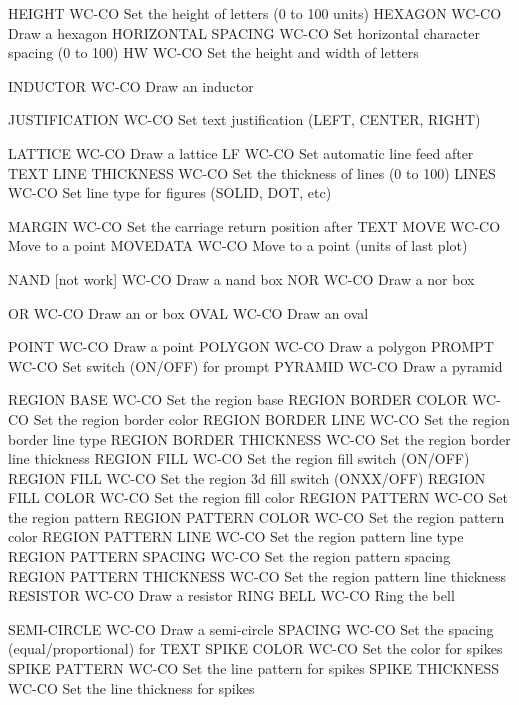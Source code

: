 HEIGHT                      WC-CO Set the height of letters (0 to 100 units)
HEXAGON                     WC-CO Draw a hexagon
HORIZONTAL SPACING          WC-CO Set horizontal character spacing (0 to 100)
HW                          WC-CO Set the height and width of letters

INDUCTOR                    WC-CO Draw an inductor

JUSTIFICATION               WC-CO Set text justification (LEFT, CENTER, RIGHT)

LATTICE                     WC-CO Draw a lattice
LF                          WC-CO Set automatic line feed after TEXT
LINE THICKNESS              WC-CO Set the thickness of lines (0 to 100)
LINES                       WC-CO Set line type for figures (SOLID, DOT, etc)

MARGIN                      WC-CO Set the carriage return position after TEXT
MOVE                        WC-CO Move to a point
MOVEDATA                    WC-CO Move to a point (units of last plot)

NAND       [not work]       WC-CO Draw a nand box
NOR                         WC-CO Draw a nor box

OR                          WC-CO Draw an or box
OVAL                        WC-CO Draw an oval

POINT                       WC-CO Draw a point
POLYGON                     WC-CO Draw a polygon
PROMPT                      WC-CO Set switch (ON/OFF) for prompt
PYRAMID                     WC-CO Draw a pyramid

REGION BASE                 WC-CO Set the region base
REGION BORDER COLOR         WC-CO Set the region border color
REGION BORDER LINE          WC-CO Set the region border line type
REGION BORDER THICKNESS     WC-CO Set the region border line thickness
REGION FILL                 WC-CO Set the region fill switch (ON/OFF)
REGION FILL                 WC-CO Set the region 3d fill switch (ONXX/OFF)
REGION FILL COLOR           WC-CO Set the region fill color
REGION PATTERN              WC-CO Set the region pattern
REGION PATTERN COLOR        WC-CO Set the region pattern color
REGION PATTERN LINE         WC-CO Set the region pattern line type
REGION PATTERN SPACING      WC-CO Set the region pattern spacing
REGION PATTERN THICKNESS    WC-CO Set the region pattern line thickness
RESISTOR                    WC-CO Draw a resistor
RING BELL                   WC-CO Ring the bell

SEMI-CIRCLE                 WC-CO Draw a semi-circle
SPACING                     WC-CO Set the spacing (equal/proportional) for TEXT
SPIKE COLOR                 WC-CO Set the color for spikes
SPIKE PATTERN               WC-CO Set the line pattern for spikes
SPIKE THICKNESS             WC-CO Set the line thickness for spikes

